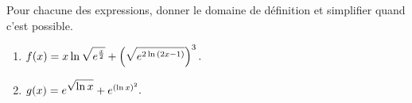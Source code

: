 \documentclass[a4paper, 11pt]{article}
\begin{document}
\begin{correction}
\begin{enumerate}
\end{enumerate}
\end{correction}








\begin{exercice}  \;
Pour chacune des expressions, donner le domaine de d\'efinition et simplifier quand c'est possible.
\begin{enumerate}
\item $f(x)=x\ln{\displaystyle\sqrt{e^{\frac{x}{2}}}}+\left( \displaystyle\sqrt{e^{2\ln{(2x-1)}}} \right)^3.$ 
\item $g(x)=e^{\displaystyle\sqrt{\ln{x}}}+e^{(\ln{x})^2}.$
\end{enumerate}
\end{exercice}
\end{document}
